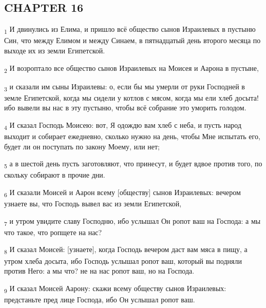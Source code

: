 \subsection{CHAPTER 16}
\begin{tcolorbox}
\textsubscript{1} И двинулись из Елима, и пришло всё общество сынов Израилевых в пустыню Син, что между Елимом и между Синаем, в пятнадцатый день второго месяца по выходе их из земли Египетской.
\end{tcolorbox}
\begin{tcolorbox}
\textsubscript{2} И возроптало все общество сынов Израилевых на Моисея и Аарона в пустыне,
\end{tcolorbox}
\begin{tcolorbox}
\textsubscript{3} и сказали им сыны Израилевы: о, если бы мы умерли от руки Господней в земле Египетской, когда мы сидели у котлов с мясом, когда мы ели хлеб досыта! ибо вывели вы нас в эту пустыню, чтобы всё собрание это уморить голодом.
\end{tcolorbox}
\begin{tcolorbox}
\textsubscript{4} И сказал Господь Моисею: вот, Я одождю вам хлеб с неба, и пусть народ выходит и собирает ежедневно, сколько нужно на день, чтобы Мне испытать его, будет ли он поступать по закону Моему, или нет;
\end{tcolorbox}
\begin{tcolorbox}
\textsubscript{5} а в шестой день пусть заготовляют, что принесут, и будет вдвое против того, по скольку собирают в прочие дни.
\end{tcolorbox}
\begin{tcolorbox}
\textsubscript{6} И сказали Моисей и Аарон всему [обществу] сынов Израилевых: вечером узнаете вы, что Господь вывел вас из земли Египетской,
\end{tcolorbox}
\begin{tcolorbox}
\textsubscript{7} и утром увидите славу Господню, ибо услышал Он ропот ваш на Господа: а мы что такое, что ропщете на нас?
\end{tcolorbox}
\begin{tcolorbox}
\textsubscript{8} И сказал Моисей: [узнаете], когда Господь вечером даст вам мяса в пищу, а утром хлеба досыта, ибо Господь услышал ропот ваш, который вы подняли против Него: а мы что? не на нас ропот ваш, но на Господа.
\end{tcolorbox}
\begin{tcolorbox}
\textsubscript{9} И сказал Моисей Аарону: скажи всему обществу сынов Израилевых: предстаньте пред лице Господа, ибо Он услышал ропот ваш.
\end{tcolorbox}
